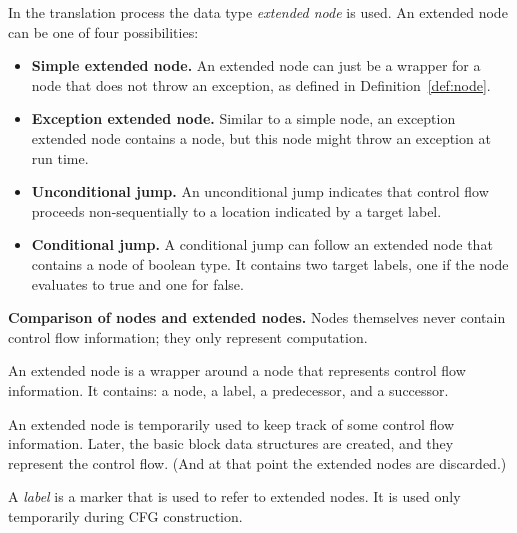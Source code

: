 \begin{definition}
    In the translation process the data type \emph{extended node} is used.
    An extended node can be one of four possibilities:
    \begin{itemize}
        \item \textbf{Simple extended node.} An extended node can just be a
          wrapper for a node that does not throw an exception,
          as defined in Definition~\ref{def:node}.
        \item \textbf{Exception extended node.} Similar to a simple
          node, an exception extended node contains a node, but this
          node might throw an exception at run time.
        \item \textbf{Unconditional jump.} An unconditional jump
          indicates that control flow proceeds non-sequentially to a
          location indicated by a target label.
        \item \textbf{Conditional jump.} A conditional jump can follow
          an extended node that contains a node of boolean type. It
          contains two target labels, one if the node evaluates to
          true and one for false.
    \end{itemize}
\end{definition}

\textbf{Comparison of nodes and extended nodes.}
Nodes themselves never contain control flow information; they only
represent computation.

An extended node is a wrapper around a node that represents control flow
information.  It contains:  a node, a label, a predecessor, and a
successor.

An extended node is temporarily used to keep track of some control flow
information.  Later, the basic block data structures are created, and they
represent the control flow.  (And at that point the extended nodes are
discarded.)
\begin{definition}[Label]
    A \emph{label} is a marker that is used to refer to extended
    nodes. It is used only temporarily during CFG construction.
\end{definition}


